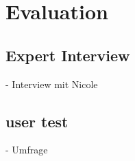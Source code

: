 \chapter{Evaluation}
\section{Expert Interview}
- Interview mit Nicole
\section{user test}
- Umfrage 